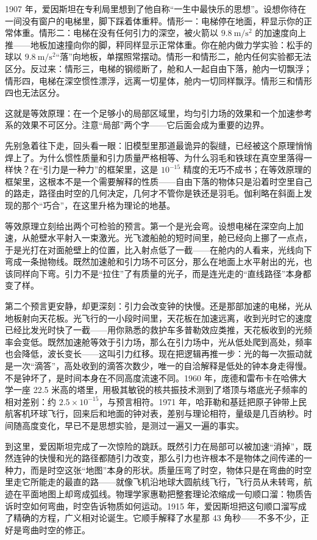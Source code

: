
\begin{mainline}
1907 年，爱因斯坦在专利局里想到了他自称“一生中最快乐的思想”。设想你待在一间没有窗户的电梯里，脚下踩着体重秤。情形一：电梯停在地面，秤显示你的正常体重。情形二：电梯在没有任何引力的深空，被火箭以 \(9.8\ \mathrm{m/s^{2}}\) 的加速度向上推——地板加速撞向你的脚，秤同样显示正常体重。你在舱内做力学实验：松手的球以 \(9.8\ \mathrm{m/s^{2}}\)“落”向地板，单摆照常摆动。情形一和情形二，舱内任何实验都无法区分。反过来：情形三，电梯的钢缆断了，舱和人一起自由下落，舱内一切飘浮；情形四，电梯在深空惯性漂浮，远离一切星体，舱内一切同样飘浮。情形三和情形四也无法区分。

这就是等效原理：在一个足够小的局部区域里，均匀引力场的效果和一个加速参考系的效果不可区分。注意“局部”两个字——它后面会成为重要的边界。

先别急着往下走，回头看一眼：旧模型里那道最诡异的裂缝，已经被这个原理悄悄焊上了。为什么惯性质量和引力质量严格相等、为什么羽毛和铁球在真空里落得一样快？在“引力是一种力”的框架里，这是 \(10^{-15}\) 精度的无巧不成书；在等效原理的框架里，这根本不是一个需要解释的性质——自由下落的物体只是沿着时空里自己的路走，路径由时空的几何决定，几何才不管你是铁还是羽毛。伽利略在斜面上发现的那个“巧合”，在这里升格为理论的地基。

等效原理立刻给出两个可检验的预言。第一个是光会弯。设想电梯在深空向上加速，从舱壁水平射入一束激光。光飞渡船舱的短时间里，舱已经向上挪了一点点，于是光打在对面舱壁上的位置，比入射点低了一截——在舱内的人看来，光线向下弯成一条抛物线。既然加速舱和引力场不可区分，那么在地面上水平射出的光，也该同样向下弯。引力不是“拉住”了有质量的光子，而是连光走的“直线路径”本身都变了样。

第二个预言更安静，却更深刻：引力会改变钟的快慢。还是那部加速的电梯，光从地板射向天花板。光飞行的一小段时间里，天花板在加速远离，收到光时它的速度已经比发光时快了一截——用你熟悉的救护车多普勒效应类推，天花板收到的光频率会变低。既然加速舱等效于引力场，那么在引力场中，光从低处爬到高处，频率也会降低，波长变长——这叫引力红移。现在把逻辑再推一步：光的每一次振动就是一次“滴答”，高处收到的滴答次数少，唯一的自洽解释是低处的钟本身走得慢。不是钟坏了，是时间本身在不同高度流速不同。1960 年，庞德和雷布卡在哈佛大学一座 22.5 米高的塔里，用极其敏锐的核共振技术测到了塔顶与塔底光子频率的相对差别：约 \(2.5\times10^{-15}\)，与预言相符。1971 年，哈菲勒和基廷把原子钟带上民航客机环球飞行，回来后和地面的钟对表，差别与理论相符，量级是几百纳秒。时间随高度变化，早已不是思想实验，是测过一遍又一遍的事实。

到这里，爱因斯坦完成了一次惊险的跳跃。既然引力在局部可以被加速“消掉”，既然连钟的快慢和光的路径都随引力改变，那么引力也许根本不是物体之间传递的一种力，而是时空这张“地图”本身的形状。质量压弯了时空，物体只是在弯曲的时空里走它所能走的最直的路——就像飞机沿地球大圆航线飞行，飞行员从未转弯，航迹在平面地图上却弯成弧线。物理学家惠勒把整套理论浓缩成一句顺口溜：物质告诉时空如何弯曲，时空告诉物质如何运动。1915 年，爱因斯坦把这句顺口溜写成了精确的方程，广义相对论诞生。它顺手解释了水星那 43 角秒——不多不少，正好是弯曲时空的修正。
\end{mainline}

